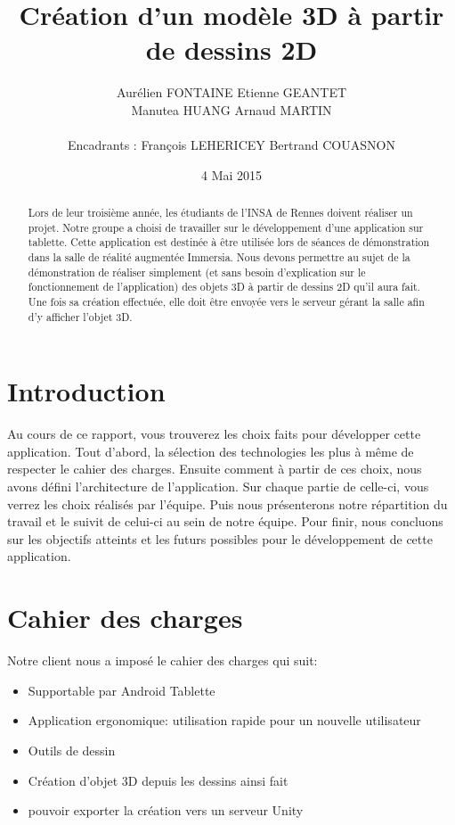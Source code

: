 \documentclass[a4paper,11pt]{article}
\title{ \textbf{Création d'un modèle 3D à partir de dessins 2D} }
\author{ Aurélien \textsc{FONTAINE} Etienne \textsc{GEANTET} \\
	Manutea \textsc{HUANG} Arnaud \textsc{MARTIN} \\
	\\
	Encadrants : François \textsc{LEHERICEY}	Bertrand \textsc{COUASNON}}
\date{4 Mai 2015}                    %
\begin{document}
\maketitle                 %
\thispagestyle{empty}      %

\begin{abstract}
	Lors de leur troisième année, les étudiants de l'INSA de Rennes doivent réaliser un projet. Notre groupe a choisi de travailler sur le développement d'une application sur tablette. Cette application est destinée à être utilisée lors de séances de démonstration dans la salle de réalité augmentée Immersia. Nous devons permettre au sujet de la démonstration de réaliser simplement (et sans besoin d'explication sur le fonctionnement de l'application) des objets 3D à partir de dessins 2D qu'il aura fait. Une fois sa création effectuée, elle doit être envoyée vers le serveur gérant la salle afin d'y afficher l'objet 3D.
\end{abstract}
	
	\section{Introduction}
		Au cours de ce rapport, vous trouverez les choix faits pour développer cette application. Tout d'abord, la sélection des technologies les plus à même de respecter le cahier des charges. Ensuite comment à partir de ces choix, nous avons défini l'architecture de l'application. Sur chaque partie de celle-ci, vous verrez les choix réalisés par l'équipe. Puis nous présenterons notre répartition du travail et le suivit de celui-ci au sein de notre équipe. Pour finir, nous concluons sur les objectifs atteints et les futurs possibles pour le développement de cette application.
	\section{Cahier des charges}
		Notre client nous a imposé le cahier des charges qui suit:
		\begin{itemize}
			\item Supportable par Android Tablette
			\item Application ergonomique: utilisation rapide pour un nouvelle utilisateur
			\item Outils de dessin
			\item Création d'objet 3D depuis les dessins ainsi fait
			\item pouvoir exporter la création vers un serveur Unity
		\end{itemize}
\end{document}
